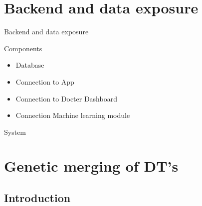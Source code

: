 \documentclass[english]{beamer}
\begin{document}
\section{Backend and data exposure}
\begin{frame}{Backend and data exposure}
	\begin{block}{Components}
		\begin{itemize}
			\item Database
			\item Connection to App
			\item Connection to Docter Dashboard
			\item Connection Machine learning module
		\end{itemize}
	\end{block}
\end{frame}
\begin{frame}{System}
	
	  \begin{center}
	  \end{center}	
\end{frame}

\section{Genetic merging of DT's}
\subsection*{Introduction}
\end{document}
